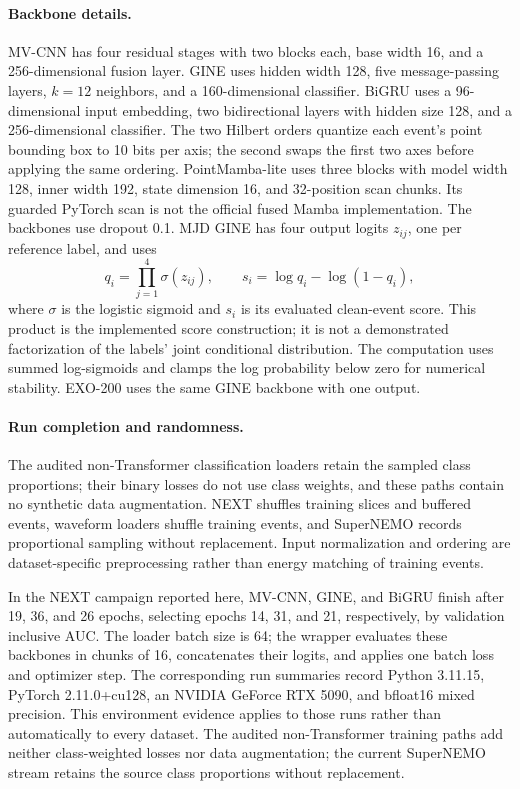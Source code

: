 \paragraph{Backbone details.}
MV-CNN has four residual stages with two blocks each, base width 16, and a 256-dimensional fusion layer. GINE uses hidden width 128, five message-passing layers, $k=12$ neighbors, and a 160-dimensional classifier. BiGRU uses a 96-dimensional input embedding, two bidirectional layers with hidden size 128, and a 256-dimensional classifier. The two Hilbert orders quantize each event's point bounding box to 10 bits per axis; the second swaps the first two axes before applying the same ordering. PointMamba-lite uses three blocks with model width 128, inner width 192, state dimension 16, and 32-position scan chunks. Its guarded PyTorch scan is not the official fused Mamba implementation. The backbones use dropout 0.1. MJD GINE has four output logits $z_{ij}$, one per reference label, and uses
\begin{equation}
 q_i=\prod_{j=1}^{4}\sigma(z_{ij}),\qquad
 s_i=\log q_i-\log(1-q_i),
\end{equation}
where $\sigma$ is the logistic sigmoid and $s_i$ is its evaluated clean-event score. This product is the implemented score construction; it is not a demonstrated factorization of the labels' joint conditional distribution. The computation uses summed log-sigmoids and clamps the log probability below zero for numerical stability. EXO-200 uses the same GINE backbone with one output.



\paragraph{Run completion and randomness.}
The audited non-Transformer classification loaders retain the sampled class proportions;
their binary losses do not use class weights, and these paths contain no
synthetic data augmentation. NEXT shuffles training slices and buffered
events, waveform loaders shuffle training events, and SuperNEMO records
proportional sampling without replacement. Input normalization and ordering
are dataset-specific preprocessing rather than energy matching of training
events.

In the NEXT campaign reported here, MV-CNN, GINE, and BiGRU finish after 19, 36, and 26 epochs, selecting epochs 14, 31, and 21, respectively, by validation inclusive AUC. The loader batch size is 64; the wrapper evaluates these backbones in chunks of 16, concatenates their logits, and applies one batch loss and optimizer step. The corresponding run summaries record Python 3.11.15, PyTorch 2.11.0+cu128, an NVIDIA GeForce RTX 5090, and bfloat16 mixed precision. This environment evidence applies to those runs rather than automatically to every dataset. The audited non-Transformer training paths add neither class-weighted losses nor data augmentation; the current SuperNEMO stream retains the source class proportions without replacement.

